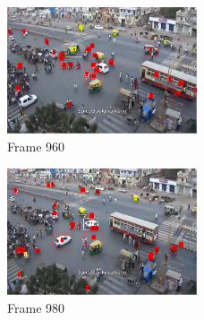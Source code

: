 \documentclass[a4paper, 10pt, conference]{ieeeconf}      %
\begin{document}
\newpage

\begin{figure}[h!]
\caption{Frame 960}
\centering
\includegraphics[width=0.5\textwidth]{960.jpg}
\end{figure}

\begin{figure}[h!]
\caption{Frame 980}
\centering
\includegraphics[width=0.5\textwidth]{980.jpg}
\end{figure}
\end{document}
